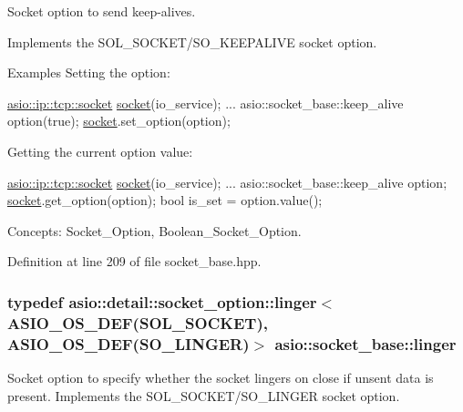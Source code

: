 Socket option to send keep-\/alives. 

Implements the S\+O\+L\+\_\+\+S\+O\+C\+K\+E\+T/\+S\+O\+\_\+\+K\+E\+E\+P\+A\+L\+I\+V\+E socket option.

\begin{DoxyParagraph}{Examples}
Setting the option\+: 
\begin{DoxyCode}
\hyperlink{classasio_1_1basic__stream__socket}{asio::ip::tcp::socket} \hyperlink{namespacewebsocketpp_1_1transport_1_1asio_1_1socket_1_1error_a828ddaa5ed63a761e1b557465a35f05aa0c31b356014843e1d09514e794a539a7}{socket}(io\_service); 
...
asio::socket\_base::keep\_alive option(\textcolor{keyword}{true});
\hyperlink{namespacewebsocketpp_1_1transport_1_1asio_1_1socket_1_1error_a828ddaa5ed63a761e1b557465a35f05aa0c31b356014843e1d09514e794a539a7}{socket}.set\_option(option);
\end{DoxyCode}

\end{DoxyParagraph}
\begin{DoxyParagraph}{}
Getting the current option value\+: 
\begin{DoxyCode}
\hyperlink{classasio_1_1basic__stream__socket}{asio::ip::tcp::socket} \hyperlink{namespacewebsocketpp_1_1transport_1_1asio_1_1socket_1_1error_a828ddaa5ed63a761e1b557465a35f05aa0c31b356014843e1d09514e794a539a7}{socket}(io\_service); 
...
asio::socket\_base::keep\_alive option;
\hyperlink{namespacewebsocketpp_1_1transport_1_1asio_1_1socket_1_1error_a828ddaa5ed63a761e1b557465a35f05aa0c31b356014843e1d09514e794a539a7}{socket}.get\_option(option);
\textcolor{keywordtype}{bool} is\_set = option.value();
\end{DoxyCode}

\end{DoxyParagraph}
\begin{DoxyParagraph}{Concepts\+:}
Socket\+\_\+\+Option, Boolean\+\_\+\+Socket\+\_\+\+Option. 
\end{DoxyParagraph}


Definition at line 209 of file socket\+\_\+base.\+hpp.

\hypertarget{classasio_1_1socket__base_a0c1a9362331c7574dbf3ec48d2491c34}{}
\subsubsection[{linger}]{\setlength{\rightskip}{0pt plus 5cm}typedef {\bf asio\+::detail\+::socket\+\_\+option\+::linger}$<$ {\bf A\+S\+I\+O\+\_\+\+O\+S\+\_\+\+D\+E\+F}(S\+O\+L\+\_\+\+S\+O\+C\+K\+E\+T), {\bf A\+S\+I\+O\+\_\+\+O\+S\+\_\+\+D\+E\+F}(S\+O\+\_\+\+L\+I\+N\+G\+E\+R)$>$ {\bf asio\+::socket\+\_\+base\+::linger}}\label{classasio_1_1socket__base_a0c1a9362331c7574dbf3ec48d2491c34}
Socket option to specify whether the socket lingers on close if unsent data is present. Implements the S\+O\+L\+\_\+\+S\+O\+C\+K\+E\+T/\+S\+O\+\_\+\+L\+I\+N\+G\+E\+R socket option.

